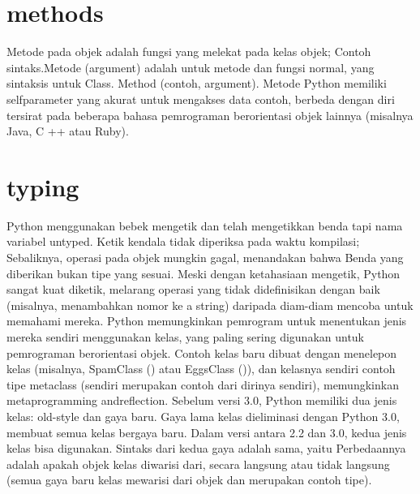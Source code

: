 	\section {methods}
	Metode pada objek adalah fungsi yang melekat pada kelas objek; Contoh sintaks.Metode (argument) adalah untuk metode dan fungsi normal, 
	yang sintaksis untuk Class. Method (contoh, argument). Metode Python memiliki selfparameter yang akurat untuk mengakses data contoh, 
	berbeda dengan diri tersirat pada beberapa bahasa pemrograman berorientasi objek lainnya (misalnya Java, C ++ atau Ruby). 
	
      	\section {typing}
	Python menggunakan bebek mengetik dan telah mengetikkan benda tapi nama variabel untyped. Ketik kendala tidak diperiksa pada waktu kompilasi; Sebaliknya, operasi pada objek mungkin gagal, menandakan bahwa
	Benda yang diberikan bukan tipe yang sesuai. Meski dengan ketahasiaan mengetik, Python sangat kuat diketik, melarang operasi yang tidak didefinisikan dengan baik (misalnya, menambahkan nomor ke a
	string) daripada diam-diam mencoba untuk memahami mereka. Python memungkinkan pemrogram untuk menentukan jenis mereka sendiri menggunakan kelas, yang paling sering
	digunakan untuk pemrograman berorientasi objek. Contoh kelas baru dibuat dengan menelepon kelas (misalnya, SpamClass () atau EggsClass ()), dan kelasnya sendiri
	contoh tipe metaclass (sendiri merupakan contoh dari dirinya sendiri), memungkinkan metaprogramming andreflection. Sebelum versi 3.0, Python memiliki dua jenis kelas: old-style dan gaya baru. Gaya lama
	kelas dieliminasi dengan Python 3.0, membuat semua kelas bergaya baru. Dalam versi antara 2.2 dan 3.0, kedua jenis kelas bisa digunakan. Sintaks dari kedua gaya adalah sama, yaitu
	Perbedaannya adalah apakah objek kelas diwarisi dari, secara langsung atau tidak langsung (semua gaya baru kelas mewarisi dari objek dan merupakan contoh tipe).
      
